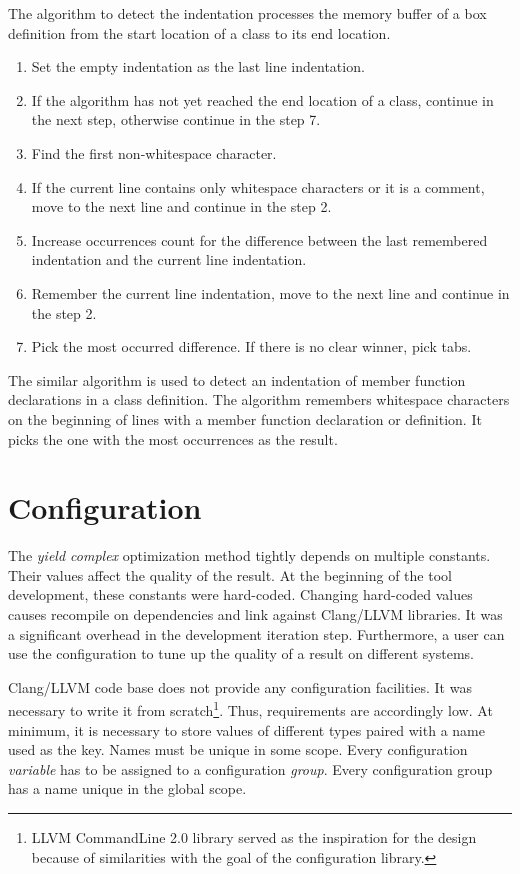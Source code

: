The algorithm to detect the indentation processes the memory buffer of a box definition from the start location of a class to its end location.

\begin{enumerate}
\item{Set the empty indentation as the last line indentation.}
\item{If the algorithm has not yet reached the end location of a class, continue in the next step, otherwise continue in the step 7.}
\item{Find the first non-whitespace character.}
\item{If the current line contains only whitespace characters or it is a comment, move to the next line and continue in the step 2.}
\item{Increase occurrences count for the difference between the last remembered indentation and the current line indentation.}
\item{Remember the current line indentation, move to the next line and continue in the step 2.}
\item{Pick the most occurred difference. If there is no clear winner, pick tabs.}
\end{enumerate}

The similar algorithm is used to detect an indentation of member function declarations in a class definition. The algorithm remembers whitespace characters on the beginning of lines with a member function declaration or definition. It picks the one with the most occurrences as the result.

\section{Configuration}
\label{opt-configuration}
The \emph{yield complex} optimization method tightly depends on multiple constants. Their values affect the quality of the result. At the beginning of the tool development, these constants were hard-coded. Changing hard-coded values causes recompile on dependencies and link against Clang/LLVM libraries. It was a significant overhead in the development iteration step. Furthermore, a user can use the configuration to tune up the quality of a result on different systems.

Clang/LLVM code base does not provide any configuration facilities. It was necessary to write it from scratch\footnote{LLVM CommandLine 2.0 library served as the inspiration for the design because of similarities with the goal of the configuration library.}. Thus, requirements are accordingly low. At minimum, it is necessary to store values of different types paired with a name used as the key. Names must be unique in some scope. Every configuration \emph{variable} has to be assigned to a configuration \emph{group}. Every configuration group has a name unique in the global scope.

